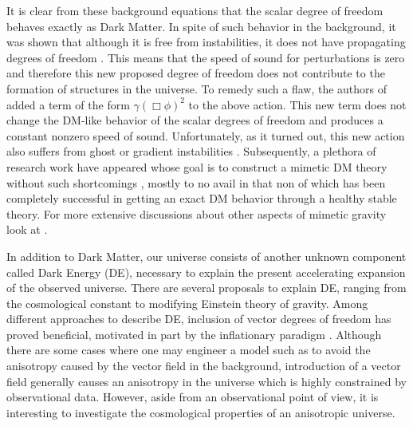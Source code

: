 \documentclass[%
 reprint,
 amsmath,amssymb,
 aps,
]{revtex4-1}
\begin{document}
It is clear from these background equations that the scalar degree of freedom behaves exactly as Dark Matter. In spite of such behavior in the background, it was shown that although it is free from instabilities, it does not have propagating degrees of freedom \citep{Barvinsky:2013mea}. This means that the speed of sound for perturbations is zero and therefore this new proposed degree of freedom does not contribute to the formation of structures in the universe. To remedy such a flaw, the authors of \cite{Chamseddine:2014vna,Capela:2014xta,Mirzagholi:2014ifa,Chamseddine:2016uef} added a term of the form $\gamma (\Box\phi)^2$ to the above action. This new term does not change the DM-like behavior of the scalar degrees of freedom and produces a constant nonzero speed of sound. Unfortunately, as it turned out, this new action also suffers from  ghost or gradient instabilities \citep{Ijjas:2016pad,Ramazanov:2016xhp,Firouzjahi:2017txv}. Subsequently, a plethora of research work have appeared whose goal is to construct a mimetic DM theory without such shortcomings \cite{Hirano:2017zox,Zheng:2017qfs, Gorji:2017cai,Takahashi:2017pje}, mostly to no avail in that non of which has been completely successful in getting an exact DM behavior through a healthy stable theory. For more extensive discussions about other aspects of mimetic gravity look at \cite{Sebastiani:2016ras}.

In addition to Dark Matter, our universe consists of another unknown component called Dark Energy (DE), necessary to explain the present accelerating expansion of the observed universe. There are several proposals to explain DE, ranging from the cosmological constant to modifying Einstein theory of gravity. Among different  approaches to describe DE, inclusion of vector degrees of freedom \cite{ArmendarizPicon:2004pm,Wei:2006tn,Jimenez:2008au,Haghani:2016oxv} has proved beneficial, motivated in part by the inflationary paradigm \cite{Gumrukcuoglu:2007bx,Koivisto:2008xf,Dulaney:2010,Gumrukcuoglu:2010yc,Emami:2013bk}. Although there are some cases where one may engineer a model such as to avoid the anisotropy caused by the  vector field in the background,  introduction of a vector field generally causes an anisotropy in the universe which is highly constrained by observational data. However, aside from an observational point of view, it is interesting to investigate the cosmological properties of an anisotropic universe.
\end{document}
